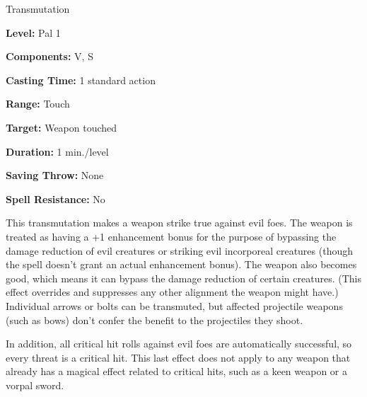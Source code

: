 
Transmutation

\textbf{Level:} Pal 1

\textbf{Components:} V, S

\textbf{Casting Time:} 1 standard action

\textbf{Range:} Touch

\textbf{Target:} Weapon touched

\textbf{Duration:} 1 min./level

\textbf{Saving Throw:} None

\textbf{Spell Resistance:} No

This transmutation makes a weapon strike true against evil foes. The weapon is 
treated as having a +1 enhancement bonus for the purpose of bypassing the damage 
reduction of evil creatures or striking evil incorporeal creatures (though the 
spell doesn't grant an actual enhancement bonus). The weapon also becomes good, 
which means it can bypass the damage reduction of certain creatures. (This effect 
overrides and suppresses any other alignment the weapon might have.) Individual 
arrows or bolts can be transmuted, but affected projectile weapons (such as bows) 
don't confer the benefit to the projectiles they shoot.

In addition, all critical hit rolls against evil foes are automatically successful, 
so every threat is a critical hit. This last effect does not apply to any weapon 
that already has a magical effect related to critical hits, such as a keen weapon 
or a vorpal sword.

